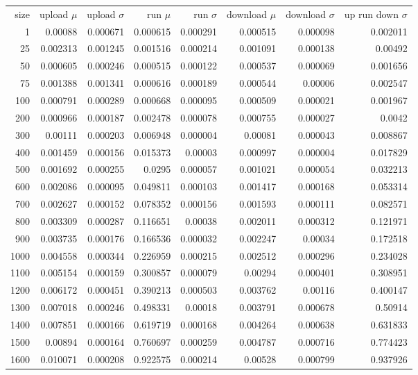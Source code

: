 \begin{tabular}{r r r r r r r r}
size & upload $\mu$  & upload $\sigma$ & run $\mu$ & run $\sigma$ & download $\mu$ & download $\sigma$ & up run down $\sigma$ \\
1 & 0.00088 & 0.000671 & 0.000615 & 0.000291 & 0.000515 & 0.000098 & 0.002011 \\
25 & 0.002313 & 0.001245 & 0.001516 & 0.000214 & 0.001091 & 0.000138 & 0.00492 \\
50 & 0.000605 & 0.000246 & 0.000515 & 0.000122 & 0.000537 & 0.000069 & 0.001656 \\
75 & 0.001388 & 0.001341 & 0.000616 & 0.000189 & 0.000544 & 0.00006 & 0.002547 \\
100 & 0.000791 & 0.000289 & 0.000668 & 0.000095 & 0.000509 & 0.000021 & 0.001967 \\
200 & 0.000966 & 0.000187 & 0.002478 & 0.000078 & 0.000755 & 0.000027 & 0.0042 \\
300 & 0.00111 & 0.000203 & 0.006948 & 0.000004 & 0.00081 & 0.000043 & 0.008867 \\
400 & 0.001459 & 0.000156 & 0.015373 & 0.00003 & 0.000997 & 0.000004 & 0.017829 \\
500 & 0.001692 & 0.000255 & 0.0295 & 0.000057 & 0.001021 & 0.000054 & 0.032213 \\
600 & 0.002086 & 0.000095 & 0.049811 & 0.000103 & 0.001417 & 0.000168 & 0.053314 \\
700 & 0.002627 & 0.000152 & 0.078352 & 0.000156 & 0.001593 & 0.000111 & 0.082571 \\
800 & 0.003309 & 0.000287 & 0.116651 & 0.00038 & 0.002011 & 0.000312 & 0.121971 \\
900 & 0.003735 & 0.000176 & 0.166536 & 0.000032 & 0.002247 & 0.00034 & 0.172518 \\
1000 & 0.004558 & 0.000344 & 0.226959 & 0.000215 & 0.002512 & 0.000296 & 0.234028 \\
1100 & 0.005154 & 0.000159 & 0.300857 & 0.000079 & 0.00294 & 0.000401 & 0.308951 \\
1200 & 0.006172 & 0.000451 & 0.390213 & 0.000503 & 0.003762 & 0.00116 & 0.400147 \\
1300 & 0.007018 & 0.000246 & 0.498331 & 0.00018 & 0.003791 & 0.000678 & 0.50914 \\
1400 & 0.007851 & 0.000166 & 0.619719 & 0.000168 & 0.004264 & 0.000638 & 0.631833 \\
1500 & 0.00894 & 0.000164 & 0.760697 & 0.000259 & 0.004787 & 0.000716 & 0.774423 \\
1600 & 0.010071 & 0.000208 & 0.922575 & 0.000214 & 0.00528 & 0.000799 & 0.937926 \\

\end{tabular}
